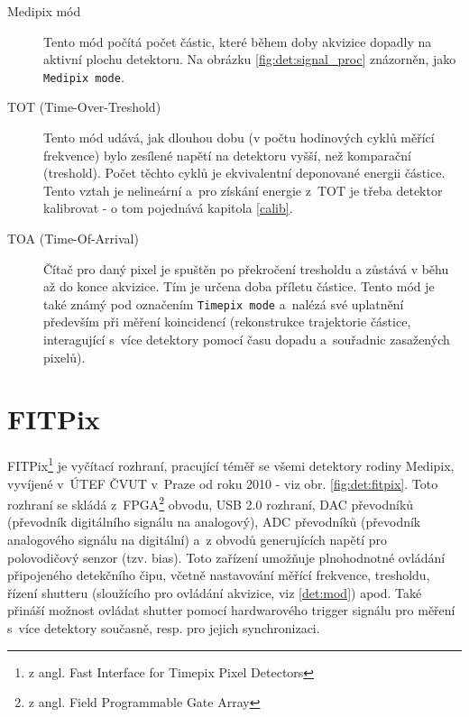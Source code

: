 \begin{description}
	\item[Medipix mód] Tento mód počítá počet částic, které během doby akvizice dopadly na aktivní plochu detektoru. Na obrázku \ref{fig:det:signal_proc} znázorněn, jako \texttt{Medipix mode}.
	\item[TOT (Time-Over-Treshold)] Tento mód udává, jak dlouhou dobu (v počtu hodinových cyklů měřící frekvence) bylo zesílené napětí na detektoru vyšší, než komparační (treshold). Počet těchto cyklů je ekvivalentní deponované energii částice. Tento vztah je nelineární a~pro získání energie z~TOT je třeba detektor kalibrovat - o tom pojednává kapitola \ref{calib}.
	\item[TOA (Time-Of-Arrival)] Čítač pro daný pixel je spuštěn po překročení tresholdu a zůstává v běhu až do konce akvizice. Tím je určena doba příletu částice. Tento mód je také známý pod označením \texttt{Timepix mode} a~nalézá své uplatnění především při měření koincidencí (rekonstrukce trajektorie částice, interagující s~více detektory pomocí času dopadu a~souřadnic zasažených pixelů).

\end{description}

\section{FITPix}\label{det:fitpix}
FITPix\footnote{z angl. Fast Interface for Timepix Pixel Detectors} \cite{fitpix} je vyčítací rozhraní, pracující téměř se všemi detektory rodiny Medipix, vyvíjené v~ÚTEF ČVUT v~Praze od roku 2010 - viz obr. \ref{fig:det:fitpix}. Toto rozhraní se skládá z~FPGA\footnote{z angl. Field Programmable Gate Array} obvodu, USB 2.0 rozhraní, DAC převodníků (převodník digitálního signálu na analogový), ADC převodníků (převodník analogového signálu na digitální) a~z obvodů generujících napětí pro polovodičový senzor (tzv. bias). Toto zařízení umožňuje plnohodnotné ovládání připojeného detekčního čipu, včetně nastavování měřící frekvence, tresholdu, řízení shutteru (sloužícího pro ovládání akvizice, viz \ref{det:mod}) apod. Také přináší možnost ovládat shutter pomocí hardwarového trigger signálu pro měření s~více detektory současně, resp. pro jejich synchronizaci.

